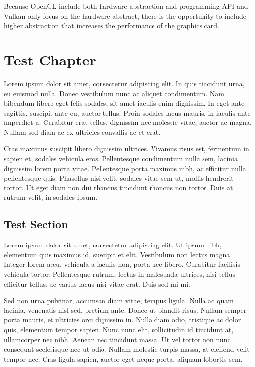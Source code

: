
Because OpenGL include both hardware abstraction and programming API and Vulkan only focus on the hardware abstract, there is the oppertunity to include higher abstraction that increases the performance of the graphics card.

\chapter{Test Chapter}\label{ch:test}
\begin{chaptermeta}
Lorem ipsum dolor sit amet, consectetur adipiscing elit. 
In quis tincidunt urna, eu euismod nulla. 
Donec vestibulum nunc ac aliquet condimentum. 
Nam bibendum libero eget felis sodales, sit amet iaculis enim dignissim. 
In eget ante sagittis, suscipit ante eu, auctor tellus. 
Proin sodales lacus mauris, in iaculis ante imperdiet a. 
Curabitur erat tellus, dignissim nec molestie vitae, auctor ac magna. 
Nullam sed diam ac ex ultricies convallis ac et erat. \cite{test01}
\end{chaptermeta}

Cras maximus suscipit libero dignissim ultrices. 
Vivamus risus est, fermentum in sapien et, sodales vehicula eros. 
Pellentesque condimentum nulla sem, lacinia dignissim lorem porta vitae. 
Pellentesque porta maximus nibh, ac efficitur nulla pellentesque quis. 
Phasellus nisi velit, sodales vitae sem ut, mollis hendrerit tortor. 
Ut eget diam non dui rhoncus tincidunt rhoncus non tortor. 
Duis at rutrum velit, in sodales ipsum.

\section{Test Section}\label{sec:test}
\begin{sectionmeta}
Lorem ipsum dolor sit amet, consectetur adipiscing elit. 
Ut ipsum nibh, elementum quis maximus id, suscipit et elit. 
Vestibulum non lectus magna. 
Integer lorem arcu, vehicula a iaculis non, porta nec libero. 
Curabitur facilisis vehicula tortor. 
Pellentesque rutrum, lectus in malesuada ultrices, nisi tellus efficitur tellus, ac varius lacus nisi vitae erat. 
Duis sed mi mi. 
\end{sectionmeta}

Sed non urna pulvinar, accumsan diam vitae, tempus ligula. 
Nulla ac quam lacinia, venenatis nisl sed, pretium ante. 
Donec ut blandit risus. 
Nullam semper porta mauris, et ultricies orci dignissim in. 
Nulla diam odio, tristique ac dolor quis, elementum tempor sapien. 
Nunc nunc elit, sollicitudin id tincidunt at, ullamcorper nec nibh. 
Aenean nec tincidunt massa. 
Ut vel tortor non nunc consequat scelerisque nec ut odio. 
Nullam molestie turpis massa, at eleifend velit tempor nec. 
Cras ligula sapien, auctor eget neque porta, aliquam lobortis sem.

